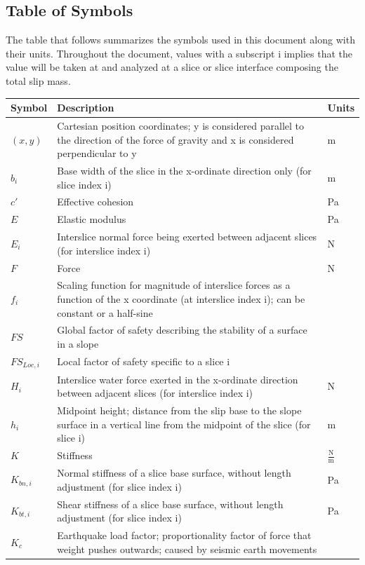 \documentclass[12pt]{article}
\begin{document}
\subsection{Table of Symbols}
\label{Sec:TablofSymb}
The table that follows summarizes the symbols used in this document along with their units. Throughout the document, values with a subscript i implies that the value will be taken at and analyzed at a slice or slice interface composing the total slip mass.
\begin{longtable*}{l l l}
\toprule
Symbol & Description & Units
\\
\midrule
$(x,y)$ & Cartesian position coordinates; y is considered parallel to the direction of the force of gravity and x is considered perpendicular to y & m
\\
$b_{i}$ & Base width of the slice in the x-ordinate direction only (for slice index i) & m
\\
$c'$ & Effective cohesion & Pa
\\
$E$ & Elastic modulus & Pa
\\
$E_{i}$ & Interslice normal force being exerted between adjacent slices (for interslice index i) & N
\\
$F$ & Force & N
\\
$f_{i}$ & Scaling function for magnitude of interslice forces as a function of the x coordinate (at interslice index i); can be constant or a half-sine & 
\\
$FS$ & Global factor of safety describing the stability of a surface in a slope & 
\\
$FS_{Loc,i}$ & Local factor of safety specific to a slice i & 
\\
$H_{i}$ & Interslice water force exerted in the x-ordinate direction between adjacent slices (for interslice index i) & N
\\
$h_{i}$ & Midpoint height; distance from the slip base to the slope surface in a vertical line from the midpoint of the slice (for slice i) & m
\\
$K$ & Stiffness & $\frac{\text{N}}{\text{m}}$
\\
$K_{bn,i}$ & Normal stiffness of a slice base surface, without length adjustment (for slice index i) & Pa
\\
$K_{bt,i}$ & Shear stiffness of a slice base surface, without length adjustment (for slice index i) & Pa
\\
$K_{c}$ & Earthquake load factor; proportionality factor of force that weight pushes outwards; caused by seismic earth movements & 

\end{longtable*}
\end{document}
